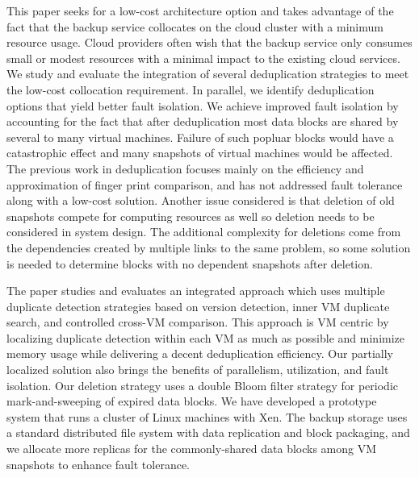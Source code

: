 This paper seeks for a low-cost architecture option and takes advantage of the
fact that the
backup service collocates on the cloud cluster with a minimum resource usage. 
Cloud providers often wish that the backup service only consumes  small or modest resources
with a minimal impact to the existing cloud services.  
We study and evaluate the integration of several deduplication strategies to meet
the low-cost collocation requirement. In parallel, we identify deduplication options that yield
better fault isolation.
We achieve improved fault isolation by accounting for the fact that after
deduplication most data blocks are shared by several to many virtual machines.
Failure of such popluar blocks would have a catastrophic effect and many
snapshots of virtual machines would be affected.
The previous work in deduplication focuses mainly on the efficiency and approximation of
finger print comparison, and has not addressed fault tolerance along with a low-cost solution.
Another issue considered is that
deletion of old snapshots compete for computing resources as well so deletion needs
to be considered in system design. The additional complexity for deletions
come from the dependencies created by multiple links to the same problem, so
some solution is needed to determine blocks with no dependent snapshots after deletion.

The paper studies and evaluates  an integrated approach which uses  multiple duplicate detection strategies
based on  version  detection, inner VM duplicate search,
and controlled cross-VM comparison. 
This approach is VM centric by localizing duplicate detection within each VM  as much as possible
and minimize memory usage while delivering a decent deduplication efficiency. 
Our partially localized solution also brings the benefits of parallelism, utilization, and fault isolation.
Our deletion strategy uses a double Bloom filter strategy for periodic mark-and-sweeping of expired data blocks.
We have developed a prototype system that runs a cluster of Linux machines with Xen.
The backup storage uses a standard distributed file system with data replication and block packaging,
and we allocate more  replicas for the commonly-shared  data blocks among VM snapshots to enhance fault tolerance.



